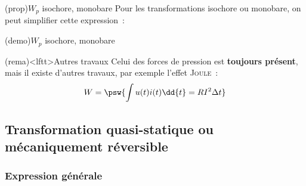 \documentclass[../../main/main.tex]{subfiles}
\begin{document}
\begin{tcb*}(prop){$W_p$ isochore, monobare}
	Pour les transformations isochore ou monobare, on peut simplifier cette
	expression~:
	\smallbreak
	\begin{isd}[sidebyside align=top]
		\psw{%
			\[
				\boxed{\delta W_p = 0}
				\Lra
				W_p = 0
			\]
		}%
		\vspace{-15pt}
		\tcblower
		\psw{%
			\[
				\boxed{W_p = -P\ind{ext}\Delta{V}}
			\]
		}%
		\vspace{-15pt}
	\end{isd}
\end{tcb*}
\begin{tcb*}[sidebyside, sidebyside align=top, lefthand ratio=.3](demo){$W_p$ isochore, monobare}
	\vspace{-15pt}
	\vspace{-15pt}
	\tcblower
	\vspace{-15pt}
	\vspace{-15pt}
\end{tcb*}

\begin{tcb}(rema)<lftt>{Autres travaux}
	Celui des forces de pression est \textbf{toujours présent}, mais
	il existe d'autres travaux, par exemple l'effet \textsc{Joule}~:
	\[
		W = \psw{\int u(t)i(t)\dd{t} = RI^2 \Delta{t}}
	\]
\end{tcb}

\subsection{Transformation quasi-statique ou mécaniquement réversible}
\subsubsection{Expression générale}
\end{document}
